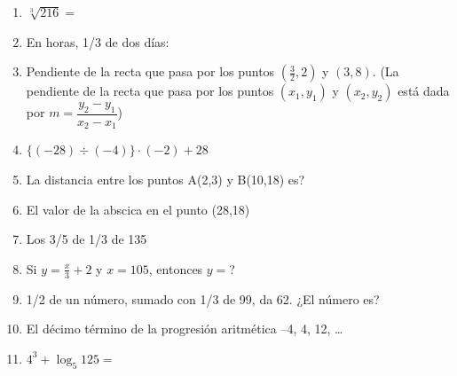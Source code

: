 \documentclass[11pt,twoside,letter]{article}
\begin{document}
\begin{enumerate}
 \item $\sqrt[3]{216}=$
 \item En horas, 1/3 de dos días:
 \item Pendiente de la recta que pasa por los puntos $\left(\frac{3}{2},2\right)$ y $(3,8)$. (La pendiente de la recta que pasa por los puntos $(x_{1},y_{1})$ y $(x_{2},y_{2})$ está dada por $m=\dfrac{y_{2}-y_{1}}{x_{2}-x_{1}}$)
 \item $\{(-28)\div(-4)\}\cdot(-2)+28$
 \item La distancia entre los puntos A(2,3) y B(10,18) es?
 \item El valor de la abscica en el punto (28,18)
 \item Los 3/5 de 1/3 de 135
 \item Si $y=\frac{x}{3}+2$ y $x=105$, entonces $y=$?
 \item 1/2 de un número, sumado con 1/3 de 99, da 62. ¿El número es?
 \item El décimo término de la progresión aritmética --4, 4, 12, \ldots
 \item $4^{3}+\log_{5}125=$
\end{enumerate}
\end{document}
